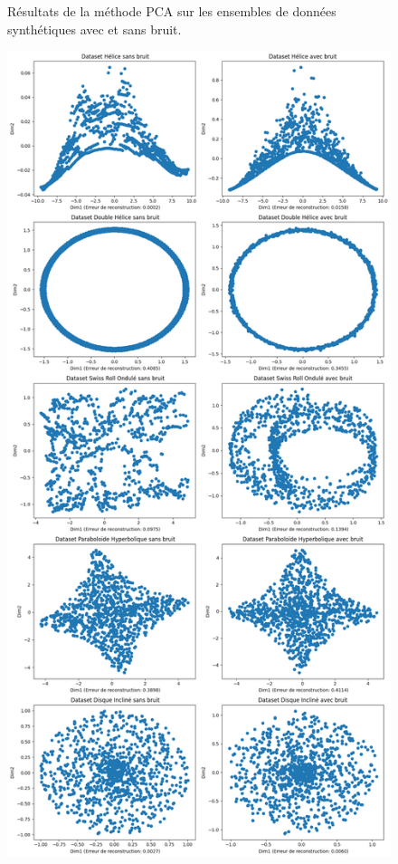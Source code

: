 \documentclass[unnumsec,webpdf,modern,large]{projet_manifold}%
\theoremstyle{thmstyleone}%
\theoremstyle{thmstyletwo}%
\theoremstyle{thmstylethree}%
\begin{document}
\begin{appendices}
\begin{figure}[b]
    \caption{Résultats de la méthode PCA sur les ensembles de données synthétiques avec et sans bruit.}
    \label{fig:resultats_PCA}
\end{figure}
\vspace*{\fill}  %

\newpage
\thispagestyle{empty}
\vspace*{\fill}  %
\begin{figure}[b]
    \centering
    \includegraphics[width=\textwidth,height=0.8\textheight,keepaspectratio]{ISOMAP.png}

\end{figure}
\end{appendices}
\end{document}

